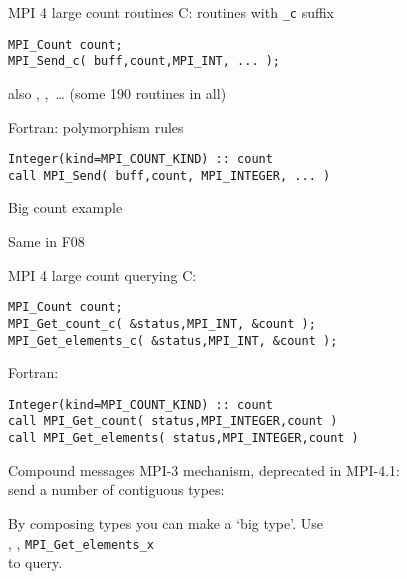 \begin{numberedframe}{MPI 4 large count routines}
C: routines with \lstinline+_c+ suffix
\begin{lstlisting}
MPI_Count count;
MPI_Send_c( buff,count,MPI_INT, ... );
\end{lstlisting}
\lstset{language=Fortran}
also , ,~\ldots
(some 190 routines in all)

Fortran: polymorphism rules
\begin{lstlisting}
Integer(kind=MPI_COUNT_KIND) :: count
call MPI_Send( buff,count, MPI_INTEGER, ... )
\end{lstlisting}
\lstset{language=C}
\end{numberedframe}

\begin{numberedframe}{Big count example}
\end{numberedframe}

\begin{numberedframe}{Same in F08}
\end{numberedframe}


\begin{numberedframe}{MPI 4 large count querying}
C: 
\begin{lstlisting}
MPI_Count count;
MPI_Get_count_c( &status,MPI_INT, &count );
MPI_Get_elements_c( &status,MPI_INT, &count );
\end{lstlisting}
\lstset{language=Fortran}
Fortran: 
\begin{lstlisting}
Integer(kind=MPI_COUNT_KIND) :: count
call MPI_Get_count( status,MPI_INTEGER,count )
call MPI_Get_elements( status,MPI_INTEGER,count )
\end{lstlisting}
\lstset{language=C}
\end{numberedframe}

\begin{numberedframe}{Compound messages}
  MPI-3 mechanism, deprecated in MPI-4.1:\\
  send a number of contiguous types:


  By composing types you can make a `big type'. Use\\
  ,
  ,
   \lstinline{MPI_Get_elements_x}\\
  to query.

\end{numberedframe}

